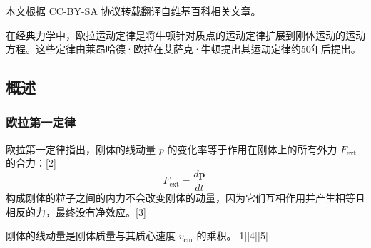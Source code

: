
本文根据 CC-BY-SA 协议转载翻译自维基百科\href{https://en.wikipedia.org/wiki/Euler\%27s_laws_of_motion}{相关文章}。

在经典力学中，欧拉运动定律是将牛顿针对质点的运动定律扩展到刚体运动的运动方程。这些定律由莱昂哈德·欧拉在艾萨克·牛顿提出其运动定律约50年后提出。

\subsection{概述}  
\subsubsection{欧拉第一定律}  
欧拉第一定律指出，刚体的线动量 \( p \) 的变化率等于作用在刚体上的所有外力 \( F_{\text{ext}} \) 的合力：[2]  
\[
F_{\text{ext}} = \frac{d\mathbf{p}}{dt}~
\]  
构成刚体的粒子之间的内力不会改变刚体的动量，因为它们互相作用并产生相等且相反的力，最终没有净效应。[3]  

刚体的线动量是刚体质量与其质心速度 \( v_{\text{cm}} \) 的乘积。[1][4][5]